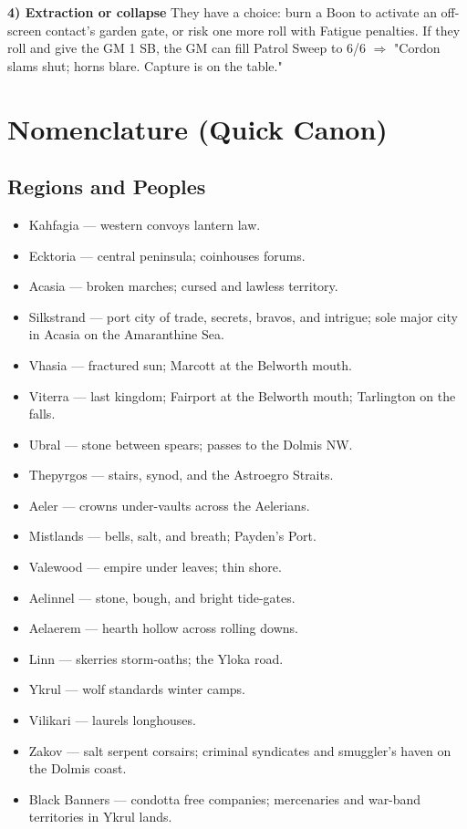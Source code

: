 \textbf{4) Extraction or collapse} They have a choice: burn a Boon to activate an off-screen contact's garden gate, or risk one more roll with Fatigue penalties. If they roll and give the GM 1 SB, the GM can fill Patrol Sweep to 6/6 $\Rightarrow$ "Cordon slams shut; horns blare. Capture is on the table."

\section{Nomenclature (Quick Canon)}

\subsection{Regions and Peoples}
\begin{itemize}
\item Kahfagia --- western convoys lantern law.
\item Ecktoria --- central peninsula; coinhouses forums.
\item Acasia --- broken marches; cursed and lawless territory.
\item Silkstrand --- port city of trade, secrets, bravos, and intrigue; sole major city in Acasia on the Amaranthine Sea.
\item Vhasia --- fractured sun; Marcott at the Belworth mouth.
\item Viterra --- last kingdom; Fairport at the Belworth mouth; Tarlington on the falls.
\item Ubral --- stone between spears; passes to the Dolmis NW.
\item Thepyrgos --- stairs, synod, and the Astroegro Straits.
\item Aeler --- crowns under-vaults across the Aelerians.
\item Mistlands --- bells, salt, and breath; Payden's Port.
\item Valewood --- empire under leaves; thin shore.
\item Aelinnel --- stone, bough, and bright tide-gates.
\item Aelaerem --- hearth hollow across rolling downs.
\item Linn --- skerries storm-oaths; the Yloka road.
\item Ykrul --- wolf standards winter camps.
\item Vilikari --- laurels longhouses.
\item Zakov --- salt serpent corsairs; criminal syndicates and smuggler's haven on the Dolmis coast.
\item Black Banners --- condotta free companies; mercenaries and war-band territories in Ykrul lands.
\end{itemize}

